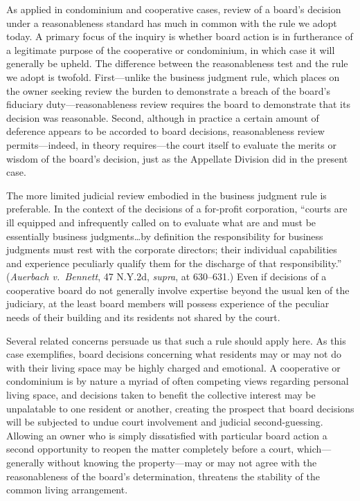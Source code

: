 As applied in condominium and cooperative cases, review of a board's decision
under a reasonableness standard has much in common with the rule we adopt today.
A primary focus of the inquiry is whether board action is in furtherance of a
legitimate purpose of the cooperative or condominium, in which case it will
generally be upheld. The difference between the reasonableness test and the rule
we adopt is twofold. First---unlike the business judgment rule, which places on
the owner seeking review the burden to demonstrate a breach of the board's
fiduciary duty---reasonableness review requires the board to demonstrate that
its decision was reasonable. Second, although in practice a certain amount of
deference appears to be accorded to board decisions, reasonableness review
permits---indeed, in theory requires---the court itself to evaluate the merits
or wisdom of the board's decision, just as the Appellate Division did in the
present case. 

The more limited judicial review embodied in the business judgment rule is
preferable. In the context of the decisions of a for-profit corporation,
``courts are ill equipped and infrequently called on to evaluate what are and
must be essentially business judgments\ldots by definition the responsibility
for business judgments must rest with the corporate directors; their individual
capabilities and experience peculiarly qualify them for the discharge of
that responsibility.'' (\textit{Auerbach v.~Bennett}, 47 N.Y.2d,
\textit{supra}, at 630--631.) Even if decisions of a cooperative board do not
generally involve expertise beyond the usual ken of the judiciary, at the least
board members will possess experience of the peculiar needs of their building
and its residents not shared by the court. 

Several related concerns persuade us that such a rule should apply here. As this
case exemplifies, board decisions concerning what residents may or may not do
with their living space may be highly charged and emotional. A cooperative or
condominium is by nature a myriad of often competing views regarding personal
living space, and decisions taken to benefit the collective interest may be
unpalatable to one resident or another, creating the prospect that board
decisions will be subjected to undue court involvement and judicial
second-guessing. Allowing an owner who is simply dissatisfied with particular
board action a second opportunity to reopen the matter completely before a
court, which---generally without knowing the property---may or may not agree
with the reasonableness of the board's determination, threatens the stability of
the common living arrangement. 

